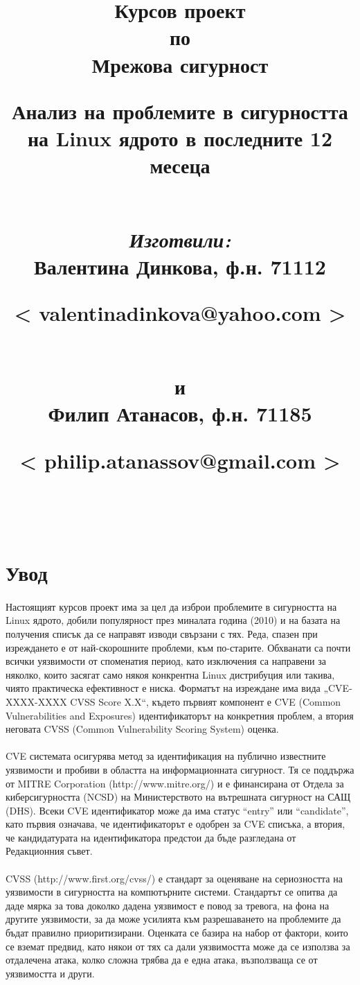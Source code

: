 \documentclass[a4paper,12pt,leqno]{article}
\title{
\vspace{0.5cm}
\begin{Large}
Курсов проект \\ по \\
Мрежова сигурност
\end{Large}
\vspace{2.0cm}
\hline
\vspace{0.5cm}
\textbf{Анализ на проблемите в сигурността на Linux ядрото в последните 12 месеца}
\vspace{0.5cm}
\hline
\\ \vspace{1.5cm}
\\ \vspace{1.0cm}\Large{\textit{Изготвили:} \vspace{1.0cm}  \\ Валентина Динкова, ф.н. 71112\\
 \begin{large}
< valentinadinkova@yahoo.com >
\end{large} \\ 
и \\ Филип Атанасов, ф.н. 71185 \\ \begin{large}
< philip.atanassov@gmail.com > 
\end{large} \\ }\vspace{3.0cm}}
\begin{document}
\maketitle
\thispagestyle{empty}
\newpage
\tableofcontents
\newpage
\section*{Увод}
\paragraph{} 
Настоящият курсов проект има за цел да изброи проблемите в сигурността на Linux ядрото, 
добили популярност през миналата година (2010) и на базата на получения списък да се направят 
изводи свързани с тях. Реда, спазен при изреждането е от най-скорошните проблеми, към 
по-старите. Обхванати са почти всички уязвимости от споменатия период, като изключения са 
направени за няколко, които засягат само някоя конкрентна Linux дистрибуция или такива, чиято 
практическа ефективност е ниска. Форматът на изреждане има вида „CVE-XXXX-XXXX CVSS Score 
X.X“, където първият компонент е CVE (Common Vulnerabilities and Exposures) идентификаторът на 
конкретния проблем, а втория неговата CVSS (Common Vulnerability Scoring System) оценка. 
\paragraph{}
CVE системата осигурява метод за идентификация на публично известните уязвимости и пробиви в 
областта на информационната сигурност.  Тя се поддържа от MITRE Corporation 
(http://www.mitre.org/) и е финансирана от Отдела за киберсигурността (NCSD) на  
Министерството на вътрешната сигурност на САЩ (DHS). Всеки CVE идентификатор може да има 
статус “entry” или “candidate”, като първия означава, че идентификаторът е одобрен за CVE 
списъка, а втория, че кандидатурата на идентификатора предстои да бъде разгледана от 
Редакционния съвет. 
\paragraph{}
CVSS (http://www.first.org/cvss/) е стандарт за оценяване на сериозността на уязвимости в 
сигурността на компютърните системи. Стандартът се опитва да даде мярка за това доколко 
дадена уязвимост е повод за тревога, на фона на другите уязвимости, за да може усилията към 
разрешаването на проблемите да бъдат правилно приоритизирани. Оценката се базира на набор 
от фактори, които се вземат предвид, като някои от тях са дали уязвимостта може да се използва 
за отдалечена атака, колко сложна трябва да е една атака, възползваща се от уязвимостта и други. 
\end{document}
